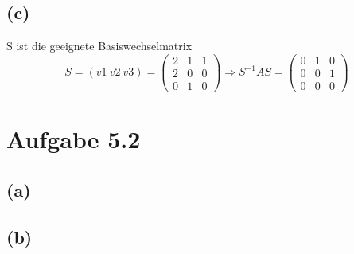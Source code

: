 \documentclass{article} %
\begin{document}
\subsection*{(c)}
S ist die geeignete Basiswechselmatrix
\[ S = (v1\ v2\ v3) = \begin{pmatrix} 
2&1&1\\ 2&0&0\\ 0&1&0
\end{pmatrix}
\Rightarrow S^{-1}AS = \begin{pmatrix}
0&1&0\\0&0&1\\0&0&0 
\end{pmatrix}
\]

\section{Aufgabe 5.2}
\subsection*{(a)}
\subsection*{(b)}
\end{document}
